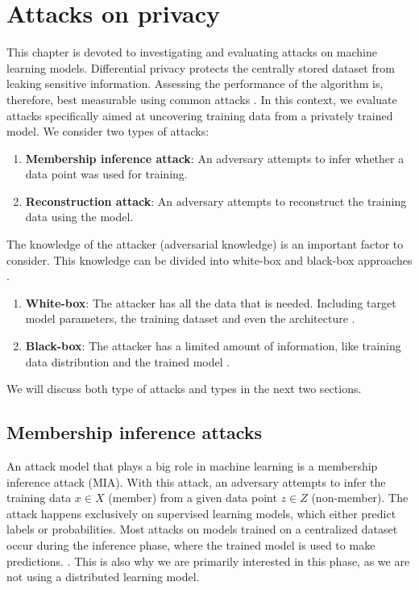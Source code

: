 \chapter{Attacks on privacy} \label{section: MIA}
This chapter is devoted to investigating and evaluating attacks on machine learning models.
Differential privacy protects the centrally stored dataset from leaking sensitive information.
Assessing the performance of the algorithm is, therefore, best measurable using common attacks \citep{jayaraman_evaluating_nodate}.
In this context, we evaluate attacks specifically aimed at uncovering training data from a privately trained model.
We consider two types of attacks:
\begin{enumerate}
  \item \textbf{Membership inference attack}: An adversary attempts to infer whether a data point was used for training.
  \item \textbf{Reconstruction attack}: An adversary attempts to reconstruct the training data using the model.
\end{enumerate}
The knowledge of the attacker (adversarial knowledge) is an important factor to consider.
This knowledge can be divided into white-box and black-box approaches \citep{hu_membership_2022}.
\begin{enumerate}
  \item \textbf{White-box}: The attacker has all the data that is needed. Including target model parameters, the training dataset and even the architecture \citep{hu_membership_2022}.
  \item \textbf{Black-box}: The attacker has a limited amount of information, like training data distribution and the trained model \citep{hu_membership_2022}.
\end{enumerate}
We will discuss both type of attacks and types in the next two sections.

\section{Membership inference attacks}
An attack model that plays a big role in machine learning is a membership inference attack (MIA).
With this attack, an adversary attempts to infer the training data $x \in X$ (member) from a given data point $z \in Z$ (non-member).
The attack happens exclusively on supervised learning models, which either predict labels or probabilities.
Most attacks on models trained on a centralized dataset occur during the inference phase, where the trained model is used to make predictions. \citep{rigaki_survey_2021}.
This is also why we are primarily interested in this phase, as we are not using a distributed learning model.

